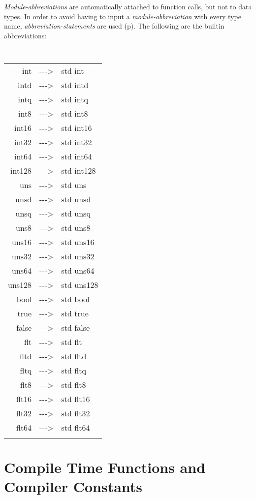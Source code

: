 \documentclass[12pt]{article}
\newcommand{\ABV}{-{}-{}->}
\newcommand{\pagref}[1]{p\pageref{#1}}
\begin{document}
{\em Module-abbreviations} are automatically attached to function
calls, but not to data types.  In order to avoid having to
input a {\em module-abbreviation} with every type name, 
{\em abbreviation-statements} are used (\pagref{ABBREVIATION-STATEMENT}).
The following are the builtin abbreviations:
\begin{center}
\tt
\begin{tabular}{rcl}
int		& \ABV & std int \\
intd		& \ABV & std intd \\
intq		& \ABV & std intq \\
int8		& \ABV & std int8 \\
int16		& \ABV & std int16 \\
int32		& \ABV & std int32 \\
int64		& \ABV & std int64 \\
int128		& \ABV & std int128
\\[1ex]
uns		& \ABV & std uns \\
unsd		& \ABV & std unsd \\
unsq		& \ABV & std unsq \\
uns8		& \ABV & std uns8 \\
uns16		& \ABV & std uns16 \\
uns32		& \ABV & std uns32 \\
uns64		& \ABV & std uns64 \\
uns128		& \ABV & std uns128
\\[1ex]
bool		& \ABV & std bool \\
true		& \ABV & std true \\
false		& \ABV & std false
\\[1ex]
flt		& \ABV & std flt \\
fltd		& \ABV & std fltd \\
fltq		& \ABV & std fltq \\
flt8		& \ABV & std flt8 \\
flt16		& \ABV & std flt16 \\
flt32		& \ABV & std flt32 \\
flt64		& \ABV & std flt64 \\
\\[1ex]
\end{tabular}
\end{center}

\section{Compile Time Functions and Compiler Constants}
\end{document}
